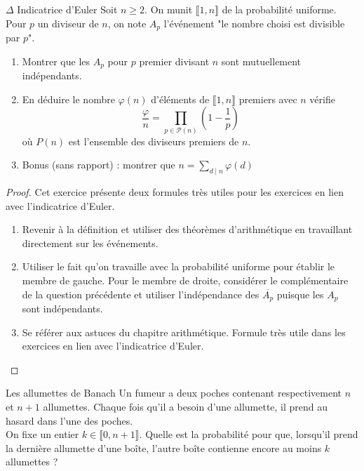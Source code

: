 \documentclass[french,a4paper]{article}
\theoremstyle{plain}
\theoremstyle{definition}
\theoremstyle{remark}
\begin{document}
\begin{ex}[Moulin.12]{$\Delta$ Indicatrice d'Euler}
	Soit $n\geqslant 2$. On munit $\llbracket 1,n\rrbracket$ de la probabilité uniforme. Pour $p$ un diviseur de $n$, on note $A_p$ l'événement "le nombre choisi est divisible par $p$".
	\begin{enumerate}
		\item Montrer que les $A_p$ pour $p$ premier divisant $n$ sont mutuellement indépendants.
		\item En déduire le nombre $\varphi(n)$ d'éléments de $\llbracket1,n\rrbracket$ premiers avec $n$ vérifie $$\frac{\varphi}{n}=\prod_{p\in\mathcal{P}(n)}\left(1-\frac{1}{p}\right)$$ où $P(n)$ est l'ensemble des diviseurs premiers de $n$.
		\item Bonus (sans rapport) : montrer que $n=\displaystyle\sum_{d\mid n}\varphi(d)$
	\end{enumerate}
\end{ex}
\begin{proof}
	Cet exercice présente deux formules très utiles pour les exercices en lien avec l'indicatrice d'Euler.
	\begin{enumerate}
		\item Revenir à la définition et utiliser des théorèmes d'arithmétique en travaillant directement sur les événements.
		\item Utiliser le fait qu'on travaille avec la probabilité uniforme pour établir le membre de gauche. Pour le membre de droite, considérer le complémentaire de la question précédente et utiliser l'indépendance des $\overline{A_p}$ puisque les $A_p$ sont indépendants.
		\item Se référer aux astuces du chapitre arithmétique. Formule très utile dans les exercices en lien avec l'indicatrice d'Euler.
	\end{enumerate}
\end{proof}

\begin{ex}[Moulin.13]{Les allumettes de Banach}
	Un fumeur a deux poches contenant respectivement $n$ et $n+1$ allumettes. Chaque fois qu'il a besoin d'une allumette, il prend au hasard dans l'une des poches.\\ On fixe un entier $k\in\llbracket0,n+1\rrbracket$. Quelle est la probabilité pour que, lorsqu'il prend la dernière allumette d'une boîte, l'autre boîte contienne encore au moins $k$ allumettes ?
\end{ex}
\end{document}
